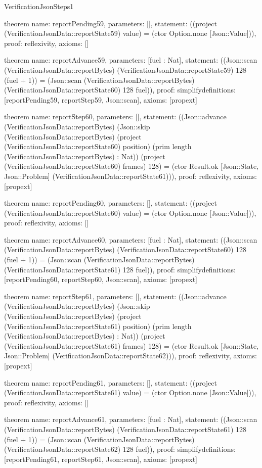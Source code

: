 \begin{lexlean}{VerificationJsonSteps1}
\begin{semanticmodule}
theorem{
  name: reportPending59,
  parameters: [],
  statement: ((project (VerificationJsonData::reportState59) value) = (ctor Option.none [Json::Value])),
  proof: reflexivity{},
  axioms: []
}

theorem{
  name: reportAdvance59,
  parameters: [fuel : Nat],
  statement: ((Json::scan (VerificationJsonData::reportBytes) (VerificationJsonData::reportState59) 128 (fuel + 1)) = (Json::scan (VerificationJsonData::reportBytes) (VerificationJsonData::reportState60) 128 fuel)),
  proof: simplify{definitions: [reportPending59, reportStep59, Json::scan]},
  axioms: [propext]
}

theorem{
  name: reportStep60,
  parameters: [],
  statement: ((Json::advance (VerificationJsonData::reportBytes) (Json::skip (VerificationJsonData::reportBytes) (project (VerificationJsonData::reportState60) position) (prim length (VerificationJsonData::reportBytes) : Nat)) (project (VerificationJsonData::reportState60) frames) 128) = (ctor Result.ok [Json::State, Json::Problem] (VerificationJsonData::reportState61))),
  proof: reflexivity{},
  axioms: [propext]
}

theorem{
  name: reportPending60,
  parameters: [],
  statement: ((project (VerificationJsonData::reportState60) value) = (ctor Option.none [Json::Value])),
  proof: reflexivity{},
  axioms: []
}

theorem{
  name: reportAdvance60,
  parameters: [fuel : Nat],
  statement: ((Json::scan (VerificationJsonData::reportBytes) (VerificationJsonData::reportState60) 128 (fuel + 1)) = (Json::scan (VerificationJsonData::reportBytes) (VerificationJsonData::reportState61) 128 fuel)),
  proof: simplify{definitions: [reportPending60, reportStep60, Json::scan]},
  axioms: [propext]
}

theorem{
  name: reportStep61,
  parameters: [],
  statement: ((Json::advance (VerificationJsonData::reportBytes) (Json::skip (VerificationJsonData::reportBytes) (project (VerificationJsonData::reportState61) position) (prim length (VerificationJsonData::reportBytes) : Nat)) (project (VerificationJsonData::reportState61) frames) 128) = (ctor Result.ok [Json::State, Json::Problem] (VerificationJsonData::reportState62))),
  proof: reflexivity{},
  axioms: [propext]
}

theorem{
  name: reportPending61,
  parameters: [],
  statement: ((project (VerificationJsonData::reportState61) value) = (ctor Option.none [Json::Value])),
  proof: reflexivity{},
  axioms: []
}

theorem{
  name: reportAdvance61,
  parameters: [fuel : Nat],
  statement: ((Json::scan (VerificationJsonData::reportBytes) (VerificationJsonData::reportState61) 128 (fuel + 1)) = (Json::scan (VerificationJsonData::reportBytes) (VerificationJsonData::reportState62) 128 fuel)),
  proof: simplify{definitions: [reportPending61, reportStep61, Json::scan]},
  axioms: [propext]
}


\end{semanticmodule}
\end{lexlean}
